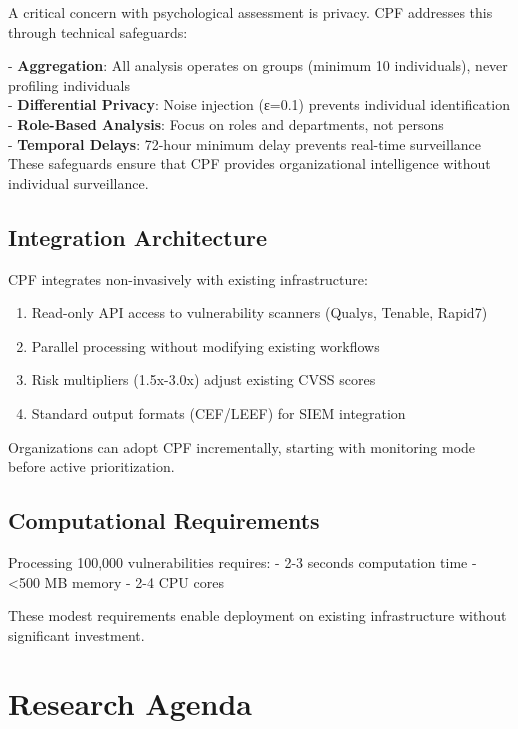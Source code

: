 \documentclass[11pt,a4paper]{article}
\begin{document}
A critical concern with psychological assessment is privacy. CPF addresses this through technical safeguards:

- \textbf{Aggregation}: All analysis operates on groups (minimum 10 individuals), never profiling individuals\\
- \textbf{Differential Privacy}: Noise injection (ε=0.1) prevents individual identification\\
- \textbf{Role-Based Analysis}: Focus on roles and departments, not persons\\
- \textbf{Temporal Delays}: 72-hour minimum delay prevents real-time surveillance\\

These safeguards ensure that CPF provides organizational intelligence without individual surveillance.

\subsection{Integration Architecture}

CPF integrates non-invasively with existing infrastructure:

\begin{enumerate}
\item Read-only API access to vulnerability scanners (Qualys, Tenable, Rapid7)
\item Parallel processing without modifying existing workflows
\item Risk multipliers (1.5x-3.0x) adjust existing CVSS scores
\item Standard output formats (CEF/LEEF) for SIEM integration
\end{enumerate}

Organizations can adopt CPF incrementally, starting with monitoring mode before active prioritization.

\subsection{Computational Requirements}

Processing 100,000 vulnerabilities requires:
- 2-3 seconds computation time
- <500 MB memory
- 2-4 CPU cores

These modest requirements enable deployment on existing infrastructure without significant investment.

\section{Research Agenda}
\end{document}
